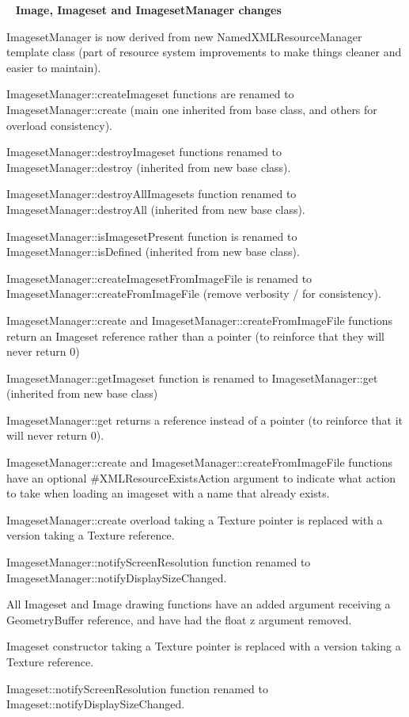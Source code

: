 ~\newline
 {\bfseries{Image, Imageset and Imageset\+Manager changes}}
\begin{DoxyItemize}
\item Imageset\+Manager is now derived from new Named\+X\+M\+L\+Resource\+Manager template class (part of resource system improvements to make things cleaner and easier to maintain).
\item {\ttfamily Imageset\+Manager\+::create\+Imageset} functions are renamed to Imageset\+Manager\+::create (main one inherited from base class, and others for overload consistency).
\item {\ttfamily Imageset\+Manager\+::destroy\+Imageset} functions renamed to Imageset\+Manager\+::destroy (inherited from new base class).
\item {\ttfamily Imageset\+Manager\+::destroy\+All\+Imagesets} function renamed to Imageset\+Manager\+::destroy\+All (inherited from new base class).
\item {\ttfamily Imageset\+Manager\+::is\+Imageset\+Present} function is renamed to Imageset\+Manager\+::is\+Defined (inherited from new base class).
\item {\ttfamily Imageset\+Manager\+::create\+Imageset\+From\+Image\+File} is renamed to Imageset\+Manager\+::create\+From\+Image\+File (remove verbosity / for consistency).
\item Imageset\+Manager\+::create and Imageset\+Manager\+::create\+From\+Image\+File functions return an Imageset reference rather than a pointer (to reinforce that they will never return 0)
\item {\ttfamily Imageset\+Manager\+::get\+Imageset} function is renamed to Imageset\+Manager\+::get (inherited from new base class)
\item Imageset\+Manager\+::get returns a reference instead of a pointer (to reinforce that it will never return 0).
\item Imageset\+Manager\+::create and Imageset\+Manager\+::create\+From\+Image\+File functions have an optional \#\+X\+M\+L\+Resource\+Exists\+Action argument to indicate what action to take when loading an imageset with a name that already exists.
\item Imageset\+Manager\+::create overload taking a Texture pointer is replaced with a version taking a Texture reference.
\item {\ttfamily Imageset\+Manager\+::notify\+Screen\+Resolution} function renamed to Imageset\+Manager\+::notify\+Display\+Size\+Changed.
\item All Imageset and Image drawing functions have an added argument receiving a Geometry\+Buffer reference, and have had the float z argument removed.
\item Imageset constructor taking a Texture pointer is replaced with a version taking a Texture reference.
\item {\ttfamily Imageset\+::notify\+Screen\+Resolution} function renamed to Imageset\+::notify\+Display\+Size\+Changed.
\end{DoxyItemize}

